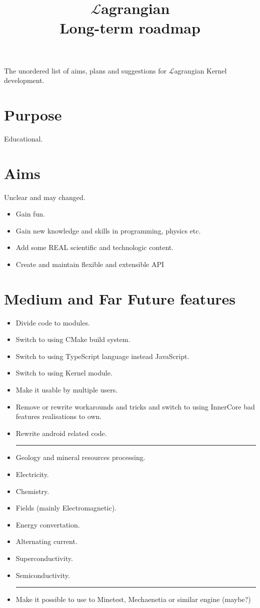 \documentclass[12pt]{article}
\title{$\mathcal{L}$agrangian \\ Long-term roadmap}
\begin{document}
	\maketitle

	The unordered list of aims, plans and suggestions for $\mathcal{L}$agrangian Kernel development.

	\section{Purpose}
	Educational.
	\section{Aims}
	Unclear and may changed.
	\begin{itemize}
		\item Gain fun.
		\item Gain new knowledge and skills in programming, physics etc.
		\item Add some REAL scientific and technologic content.
		\item Create and maintain flexible and extensible API
	\end{itemize}

	\section{Medium and Far Future features}

	\begin{itemize}
		\item Divide code to modules.
		\item Switch to using CMake build system.
		\item Switch to using TypeScript language instead JavaScript.
		\item Switch to using Kernel module.
		\item Make it usable by multiple users.
		\item Remove or rewrite workarounds and tricks and switch to using InnerCore bad features realisations to own.
		\item Rewrite android related code. \\
		\noindent\rule{\textwidth}{0.4pt}
		\item Geology and mineral resources processing.
		\item Electricity.
		\item Chemistry.
		\item Fields (mainly Electromagnetic).
		\item Energy convertation.
		\item Alternating current.
		\item Superconductivity.
		\item Semiconductivity. \\
		\noindent\rule{\textwidth}{0.4pt}
		\item Make it possible to use to Minetest, Mechaenetia or similar engine (maybe?)
	\end{itemize}
\end{document}
